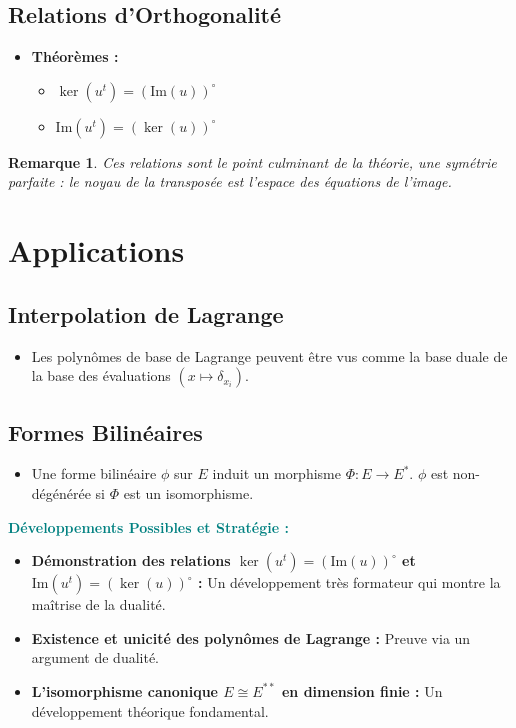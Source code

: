 \documentclass[12pt, a4paper, parskip=full]{report}
\theoremstyle{agregstyle}
\newtheorem{remark}[definition]{Remarque}
\newenvironment{developpements}
  {\par\medskip\noindent\begin{oframed}\noindent\textbf{\textcolor{teal}{Développements Possibles et Stratégie :}}}
  {\end{oframed}\par\medskip}
\begin{document}
\subsection{Relations d'Orthogonalité}
\begin{itemize}
    \item \textbf{Théorèmes :}
        \begin{itemize}
            \item $\ker(u^t) = (\mathrm{Im}(u))^\circ$
            \item $\mathrm{Im}(u^t) = (\ker(u))^\circ$
        \end{itemize}
\end{itemize}
\begin{remark}
    Ces relations sont le point culminant de la théorie, une symétrie parfaite : le noyau de la transposée est l'espace des équations de l'image.
\end{remark}

\section{Applications}
\subsection{Interpolation de Lagrange}
\begin{itemize}
    \item Les polynômes de base de Lagrange peuvent être vus comme la base duale de la base des évaluations $(x \mapsto \delta_{x_i})$.
\end{itemize}
\subsection{Formes Bilinéaires}
\begin{itemize}
    \item Une forme bilinéaire $\phi$ sur $E$ induit un morphisme $\Phi: E \to E^*$. $\phi$ est non-dégénérée si $\Phi$ est un isomorphisme.
\end{itemize}

\begin{developpements}
    \begin{itemize}
        \item \textbf{Démonstration des relations $\ker(u^t) = (\mathrm{Im}(u))^\circ$ et $\mathrm{Im}(u^t) = (\ker(u))^\circ$ :} Un développement très formateur qui montre la maîtrise de la dualité.
        \item \textbf{Existence et unicité des polynômes de Lagrange :} Preuve via un argument de dualité.
        \item \textbf{L'isomorphisme canonique $E \cong E^{**}$ en dimension finie :} Un développement théorique fondamental.
    \end{itemize}
\end{developpements}
\end{document}
